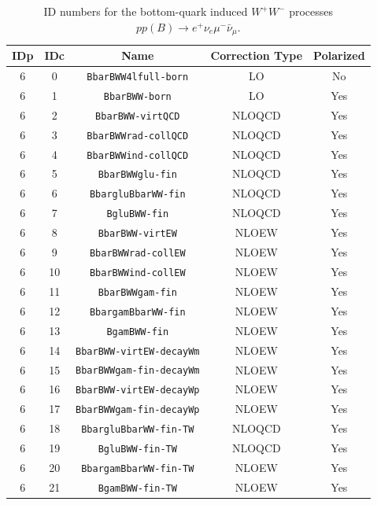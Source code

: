 \documentclass[english,12pt]{article}
\begin{document}
\begin{table}[th!]
\begin{center}
\begin{tabular}{|c|c|c|c|c|}\hline
IDp & IDc & Name & Correction Type & Polarized \\
\hline
6 & 0 & {\tt BbarBWW4lfull-born} & LO & No\\
6 & 1 & {\tt BbarBWW-born} & LO & Yes\\
6 & 2 & {\tt BbarBWW-virtQCD} & NLOQCD & Yes\\
6 & 3 & {\tt BbarBWWrad-collQCD} & NLOQCD & Yes\\
6 & 4 & {\tt BbarBWWind-collQCD} & NLOQCD & Yes\\
6 & 5 & {\tt BbarBWWglu-fin} & NLOQCD & Yes\\
6 & 6 & {\tt BbargluBbarWW-fin} & NLOQCD & Yes\\
6 & 7 & {\tt BgluBWW-fin} & NLOQCD & Yes\\
6 & 8 & {\tt BbarBWW-virtEW} & NLOEW & Yes\\
6 & 9 & {\tt BbarBWWrad-collEW} & NLOEW & Yes\\
6 & 10 & {\tt BbarBWWind-collEW} & NLOEW & Yes\\
6 & 11 & {\tt BbarBWWgam-fin} & NLOEW & Yes\\
6 & 12 & {\tt BbargamBbarWW-fin} & NLOEW & Yes\\
6 & 13 & {\tt BgamBWW-fin} & NLOEW & Yes\\
6 & 14 & {\tt BbarBWW-virtEW-decayWm} & NLOEW & Yes\\
6 & 15 & {\tt BbarBWWgam-fin-decayWm} & NLOEW & Yes\\
6 & 16 & {\tt BbarBWW-virtEW-decayWp} & NLOEW & Yes\\
6 & 17 & {\tt BbarBWWgam-fin-decayWp} & NLOEW & Yes\\
6 & 18 & {\tt BbargluBbarWW-fin-TW} & NLOQCD & Yes\\
6 & 19 & {\tt BgluBWW-fin-TW} & NLOQCD & Yes\\
6 & 20 & {\tt BbargamBbarWW-fin-TW} & NLOEW & Yes\\
6 & 21 & {\tt BgamBWW-fin-TW} & NLOEW & Yes\\
\hline
\end{tabular}
\caption{\small ID numbers for the bottom-quark induced $W^+W^-$ processes $pp(B) \to e^+\nu_e\mu^-\bar{\nu}_\mu$.}
\label{tab:IDs_proc_cont_WW_B}
\end{center}
\end{table}
\end{document}

